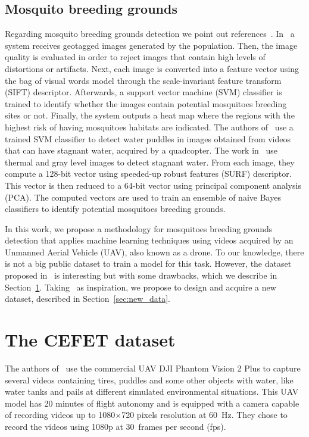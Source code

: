 \subsection{Mosquito breeding grounds}
%
Regarding mosquito breeding grounds detection we point out references~\cite{Agarwal2014a, Prasad2015a, Mehra2016a}.
%
In~\cite{Agarwal2014a} a system receives geotagged images generated by the population.
Then, the image quality is evaluated in order to reject images that contain high levels of distortions or artifacts.
Next, each image is converted into a feature vector using the bag of visual words model through
the scale-invariant feature transform (SIFT) descriptor.
Afterwards, a support vector machine (SVM) classifier is trained to identify whether the
images contain potential mosquitoes breeding sites or not.
Finally, the system outputs a heat map where the regions with the highest risk of having mosquitoes habitats are indicated.
%
The authors of~\cite{Prasad2015a} use a trained SVM classifier to detect water puddles in images obtained from videos that can have stagnant water, acquired by a quadcopter.
%
The work in~\cite{Mehra2016a} use thermal and gray level images to detect stagnant water.
From each image, they compute a 128-bit vector using speeded-up robust features (SURF)
descriptor.
This vector is then reduced to a 64-bit vector using principal component analysis (PCA).
The computed vectors are used to train an ensemble of naive Bayes classifiers to identify potential mosquitoes breeding grounds.

In this work, we propose a methodology for mosquitoes breeding grounds detection that applies machine learning techniques using videos acquired by an Unmanned Aerial Vehicle (UAV), also known as a drone.
%
To our knowledge, there is not a big public dataset to train a model for this task.
However, the dataset proposed in~\cite{casfinal2018} is interesting but with some drawbacks, which we describe in Section~\ref{sec:cefet_data}.
Taking~\cite{casfinal2018} as inspiration, we propose to design and acquire a new dataset, described in Section~\ref{sec:new_data}.


\section{The CEFET dataset}\label{sec:cefet_data}
%
The authors of~\cite{casfinal2018} use the commercial UAV DJI Phantom Vision 2 Plus to capture several videos containing tires, puddles and some other objects with water, like water tanks and pails at different simulated environmental situations.
This UAV model has 20 minutes of flight autonomy and is equipped with a camera capable of recording videos up to 1080$\times$720 pixels resolution at 60~Hz.
They chose to record the videos using 1080p at 30~frames per second (fps).

